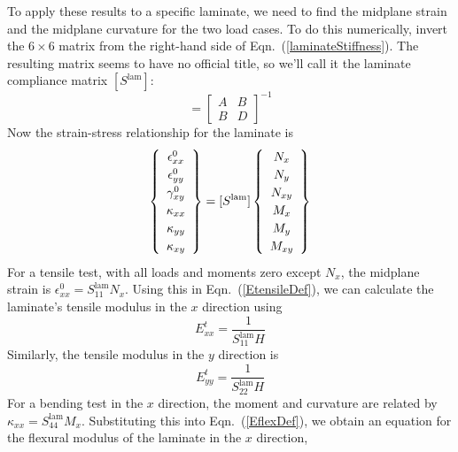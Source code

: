 \documentclass[11pt]{article}
\begin{document}
To apply these results to a specific laminate, we need to find the midplane strain and the midplane curvature for the two load cases.  To do this numerically, invert the $6 \times 6$ matrix from the right-hand side of Eqn.~(\ref{laminateStiffness}).  The resulting matrix seems to have no official title, so we'll call it the laminate compliance matrix $[S^\mathrm{lam}]$:
\begin{equation}
    [S^\mathrm{lam}] 
    = 
   \left[ \begin{array}{c|c}
            A & B \\
            \hline
            B & D
      \end{array} \right] ^{-1}
   \label{SlamDef}
\end{equation}
Now the strain-stress relationship for the laminate is
\begin{equation}
\renewcommand\arraystretch{1.2}
        \left\{ \begin{array}{c}
           \epsilon^0_{xx}  \\  \epsilon^0_{yy}  \\  \gamma^0_{xy}  \\ \kappa_{xx}  \\  \kappa_{yy}  \\  \kappa_{xy}
           \end{array} \right\}
           = [S^\mathrm{lam}] 
\renewcommand\arraystretch{1.2}
   \left\{ \begin{array}{c}
     N_x \\ N_y \\ N_{xy} \\  M_x \\ M_y \\ M_{xy}
   \end{array} \right\}
     \label{laminateCompliance}     
\end{equation}
For a tensile test, with all loads and moments zero except $N_x$, the midplane strain is $\epsilon^0_{xx} = S^\mathrm{lam}_{11} N_x$.  Using this in Eqn.~(\ref{EtensileDef}), we can calculate the laminate's tensile modulus in the $x$ direction using
\begin{equation}
     E^t_{xx} = \frac{1}{S^\mathrm{lam}_{11} H} 
     \label{EtxxFinal}
 \end{equation}
 Similarly, the tensile modulus in the $y$ direction is
\begin{equation}
     E^t_{yy} = \frac{1}{S^\mathrm{lam}_{22} H} 
     \label{EtyyFinal}
 \end{equation}
 For a bending test in the $x$ direction, the moment and curvature are related by $\kappa_{xx} = S^\mathrm{lam}_{44} M_x$.  Substituting this into Eqn.~(\ref{EflexDef}), we obtain an equation for the flexural modulus of the laminate in the $x$ direction,
\end{document}
